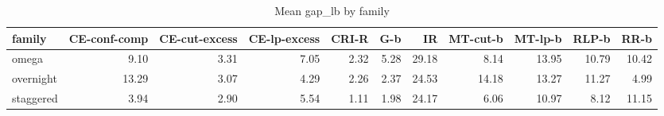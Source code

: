 \begin{table}[htbp]
\centering
\small
\caption{Mean gap\_lb by family}
\label{tab:E2b_head_to_head_budgets_b10_by_family}
\begin{tabular}{lrrrrrrrrrr}
\toprule
family & CE-conf-comp & CE-cut-excess & CE-lp-excess & CRI-R & G-b & IR & MT-cut-b & MT-lp-b & RLP-b & RR-b \\
\midrule
omega & 9.10 & 3.31 & 7.05 & 2.32 & 5.28 & 29.18 & 8.14 & 13.95 & 10.79 & 10.42 \\
overnight & 13.29 & 3.07 & 4.29 & 2.26 & 2.37 & 24.53 & 14.18 & 13.27 & 11.27 & 4.99 \\
staggered & 3.94 & 2.90 & 5.54 & 1.11 & 1.98 & 24.17 & 6.06 & 10.97 & 8.12 & 11.15 \\
\bottomrule
\end{tabular}
\end{table}
